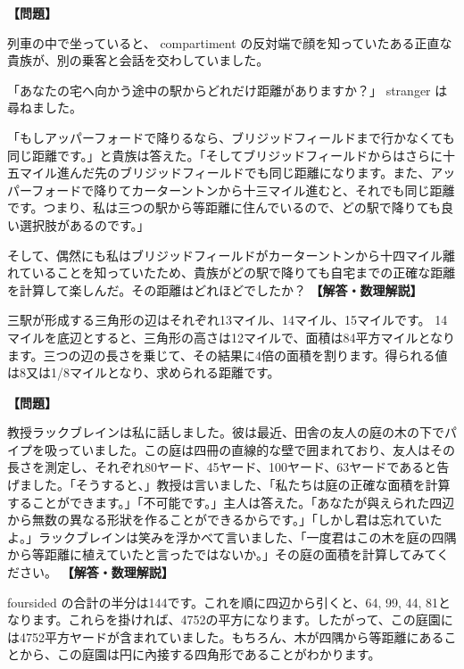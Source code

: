 \documentclass[10pt,a4paper,oneside,openany]{ltjsbook}
\begin{document}
\begin{tcolorbox}[colback=softblue,colframe=primaryblue,title=\textbf{第 181 問：THE THREE RAILWAY STATIONS.},arc=2mm,boxrule=1pt,breakable]
\textbf{【問題】}\par\vspace{0.3em}
列車の中で坐っていると、 compartiment の反対端で顔を知っていたある正直な貴族が、別の乗客と会話を交わしていました。

「あなたの宅へ向かう途中の駅からどれだけ距離がありますか？」
 stranger は尋ねました。

「もしアッパーフォードで降りるなら、ブリジッドフィールドまで行かなくても同じ距離です。」と貴族は答えた。「そしてブリジッドフィールドからはさらに十五マイル進んだ先のブリジッドフィールドでも同じ距離になります。また、アッパーフォードで降りてカーターントンから十三マイル進むと、それでも同じ距離です。つまり、私は三つの駅から等距離に住んでいるので、どの駅で降りても良い選択肢があるのです。」

そして、偶然にも私はブリジッドフィールドがカーターントンから十四マイル離れていることを知っていたため、貴族がどの駅で降りても自宅までの正確な距離を計算して楽しんだ。その距離はどれほどでしたか？
\tcblower
\textbf{【解答・数理解説】}\par\vspace{0.3em}
三駅が形成する三角形の辺はそれぞれ13マイル、14マイル、15マイルです。
14マイルを底辺とすると、三角形の高さは12マイルで、面積は84平方マイルとなります。三つの辺の長さを乗じて、その結果に4倍の面積を割ります。得られる値は8又は1/8マイルとなり、求められる距離です。
\end{tcolorbox}

\begin{tcolorbox}[colback=softblue,colframe=primaryblue,title=\textbf{第 182 問：THE GARDEN PUZZLE.},arc=2mm,boxrule=1pt,breakable]
\textbf{【問題】}\par\vspace{0.3em}
教授ラックブレインは私に話しました。彼は最近、田舎の友人の庭の木の下でパイプを吸っていました。この庭は四冊の直線的な壁で囲まれており、友人はその長さを測定し、それぞれ80ヤード、45ヤード、100ヤード、63ヤードであると告げました。「そうすると、」教授は言いました、「私たちは庭の正確な面積を計算することができます。」「不可能です。」主人は答えた。「あなたが與えられた四辺から無数の異なる形狀を作ることができるからです。」「しかし君は忘れていたよ。」ラックブレインは笑みを浮かべて言いました、「一度君はこの木を庭の四隅から等距離に植えていたと言ったではないか。」その庭の面積を計算してみてください。
\tcblower
\textbf{【解答・数理解説】}\par\vspace{0.3em}
foursided の合計の半分は144です。これを順に四辺から引くと、64, 99, 44, 81となります。これらを掛ければ、4752の平方になります。したがって、この庭園には4752平方ヤードが含まれていました。もちろん、木が四隅から等距離にあることから、この庭園は円に內接する四角形であることがわかります。
\end{tcolorbox}
\end{document}
